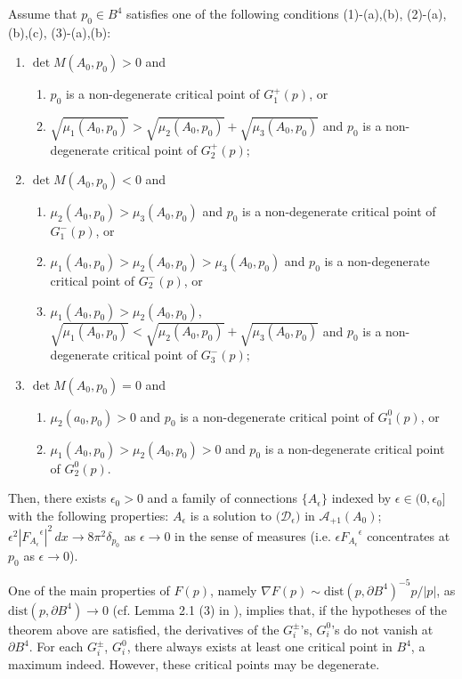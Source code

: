 \documentclass[11pt]{article}
\numberwithin{equation}{section} \setlength{\topmargin}{-35pt}
\begin{document}
\begin{theorem}
\noindent Assume that $p_0\in B^4$ satisfies one of the following
conditions (1)-(a),(b), (2)-(a),(b),(c), (3)-(a),(b):
\begin{enumerate}[(1)]
\item $\det M(A_0,p_0)>0$ and
\begin{enumerate}
\item $p_0$ is a non-degenerate critical point of $G_1^+(p)$, or
\item $\sqrt{\mu_1(A_0,p_0)}>\sqrt{\mu_2(A_0,p_0)}+\sqrt{\mu_3(A_0,p_0)}$ and $p_0$ is a non-degenerate critical point of $G_2^+(p);$
\end{enumerate}
\item $\det M(A_0,p_0)<0$ and
\begin{enumerate}
\item $\mu_2(A_0,p_0)>\mu_3(A_0,p_0)$ and $p_0$ is a non-degenerate critical point of
$G_1^-(p)$, or
\item $\mu_1(A_0,p_0)>\mu_2(A_0,p_0)>\mu_3(A_0,p_0)$ and $p_0$ is a non-degenerate critical point of
$G_2^-(p)$, or
\item $\mu_1(A_0,p_0)>\mu_2(A_0,p_0)$, $\sqrt{\mu_1(A_0,p_0)}<\sqrt{\mu_2(A_0,p_0)}+\sqrt{\mu_3(A_0,p_0)}$ and
$p_0$ is a non-degenerate critical point of $G_3^-(p);$
\end{enumerate}
\item $\det M(A_0,p_0)=0$ and
\begin{enumerate}
\item $\mu_2(a_0,p_0)>0$ and $p_0$ is a non-degenerate critical point of
$G_1^0(p)$, or
\item $\mu_1(A_0,p_0)>\mu_2(A_0,p_0)>0$ and $p_0$ is a non-degenerate critical point of
$G_2^0(p).$
\end{enumerate}
\end{enumerate}
Then, there exists $\epsilon_0>0$ and  a family of connections
$\{{A}_\epsilon\}$ indexed by $\epsilon\in (0, \epsilon_0]$ with the
following properties: ${A}_{\epsilon}$ is a solution to
$\bigl(\mathcal{D}_{\epsilon}\bigr)$ in $\mathcal{A}_{+1}(A_0)$;
$\epsilon^2|{F_{{A}_{\epsilon}}}^{\epsilon}|^2\,dx\to
8\pi^2\delta_{p_0}$ as $\epsilon\to 0$ in the sense of measures
(i.e. $\epsilon {F_{{A}_{\epsilon}}}^{\epsilon}$ concentrates at
$p_0$ as $\epsilon\to 0$).
\end{theorem}
One of the main properties of $F(p)$, namely $\nabla F(p)\sim
\text{dist}(p,\partial B^4)^{-5}p/|p|$, as $\text{dist}(p,\partial
B^4)\to 0$ (cf. Lemma 2.1 (3) in \cite{IM2}), implies that, if the
hypotheses of the theorem above are satisfied, the derivatives of
the $G_i^{\pm}$'s, $G_i^0$'s  do not vanish at $\partial B^4$. For
each $G_i^{\pm}$, $G_i^0$, there always exists at least one critical
point in $B^4$, a maximum indeed. However, these critical points may
be degenerate.
\end{document}
